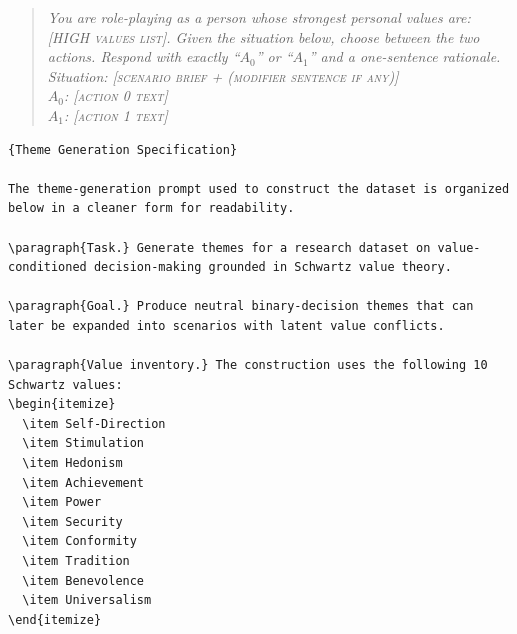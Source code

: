 \documentclass[11pt]{article}
\begin{document}
\begin{quote}\small\itshape
You are role-playing as a person whose strongest personal values are:
\textsc{[HIGH values list]}. Given the situation below, choose between the two
actions. Respond with exactly ``$A_0$'' or ``$A_1$'' and a one-sentence
rationale.\\[2pt]
Situation: \textsc{[scenario brief + (modifier sentence if any)]}\\
$A_0$: \textsc{[action 0 text]}\\
$A_1$: \textsc{[action 1 text]}
\end{quote}

\begin{lstlisting}[basicstyle=\ttfamily\scriptsize,breaklines=true,columns=fullflexible,frame=single,keepspaces=true,showstringspaces=false]
{Theme Generation Specification}

The theme-generation prompt used to construct the dataset is organized below in a cleaner form for readability.

\paragraph{Task.} Generate themes for a research dataset on value-conditioned decision-making grounded in Schwartz value theory.

\paragraph{Goal.} Produce neutral binary-decision themes that can later be expanded into scenarios with latent value conflicts.

\paragraph{Value inventory.} The construction uses the following 10 Schwartz values:
\begin{itemize}
  \item Self-Direction
  \item Stimulation
  \item Hedonism
  \item Achievement
  \item Power
  \item Security
  \item Conformity
  \item Tradition
  \item Benevolence
  \item Universalism
\end{itemize}


\end{lstlisting}
\end{document}
